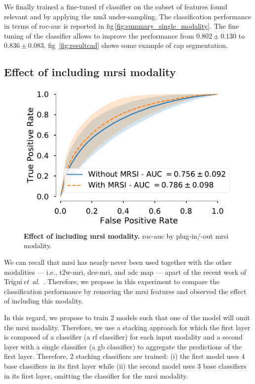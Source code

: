 \documentclass[final,3p,times,twocolumn]{elsarticle}
\begin{document}
We finally trained a fine-tuned \ac{rf} classifier on the subset of features
found relevant and by applying the \ac{nm3} under-sampling. The classification
performance in terms of \ac{roc}-\ac{auc} is reported in
\acs{fig}\,\ref{fig:summary_single_modality}. The fine tuning of the classifier
allows to improve the performance from $0.802 \pm 0.130$ to $0.836 \pm 0.083$.
\Acl{fig}~\ref{fig:resultcad} shows some example of \ac{cap} segmentation.

\subsection{Effect of including \acs*{mrsi} modality}\label{discussion:mrsi}

\begin{figure}
  \includegraphics[width=.45\textwidth]{images/stacking_wt_mrsi.pdf}
  \caption{\textbf{Effect of including \ac{mrsi} modality.} \ac{roc}-\ac{auc}
    by plug-in/-out \ac{mrsi} modality.}
  \label{fig:stacking_mrsi}
\end{figure}

We can recall that \ac{mrsi} has nearly never been used together with the other
modalities --- i.e., \ac{t2w}-\ac{mri}, \ac{dce}-\ac{mri}, and \ac{adc} map ---
apart of the recent work of
Trigui\,\emph{et~al.}~\cite{trigui2016classification,trigui2017automatic}.
Therefore, we propose in this experiment to compare the classification
performance by removing the \ac{mrsi} features and observed the effect of
including this modality.

In this regard, we propose to train 2 models such that one of the model will
omit the \ac{mrsi} modality. Therefore, we use a stacking approach for which
the first layer is composed of a classifier (a \ac{rf} classifier) for each
input modality and a second layer with a single classifier (a \ac{gb}
classifier) to aggregate the predictions of the first layer. Therefore, 2
stacking classifiers are trained: (i) the first model uses 4 base
classifiers in its first layer while (ii) the second model uses 3 base
classifiers in its first layer, omitting the classifier for the \ac{mrsi}
modality.
\end{document}

